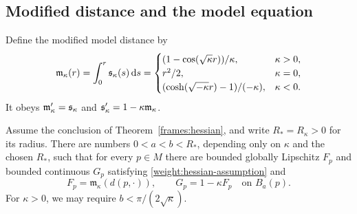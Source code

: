\subsection{Modified distance and the model equation}

Define the modified model distance by
\[
\mathfrak m_\kappa(r)=\int_0^r\mathfrak s_\kappa(s)\,\mathrm d s
=\begin{cases}
(1-\cos(\sqrt\kappa r))/\kappa,&\kappa>0,\\
r^2/2,&\kappa=0,\\
(\cosh(\sqrt{-\kappa}r)-1)/(-\kappa),&\kappa<0.
\end{cases}
\]
It obeys \(\mathfrak m_\kappa'=\mathfrak s_\kappa\) and
\(\mathfrak s'_\kappa=1-\kappa\mathfrak m_\kappa\).

\begin{lemma}
\label{weight:distance-modification}
Assume the conclusion of Theorem~\ref{frames:hessian}, and
write \(R_*=R_\kappa>0\) for its radius.
There are numbers \(0<a<b<R_*\),
depending only on \(\kappa\) and the chosen \(R_*\), such that for every \(p\in M\)
there are bounded globally Lipschitz \(F_p\) and bounded
continuous \(G_p\) satisfying \eqref{weight:hessian-assumption}
and
\begin{equation}
\label{weight:local-modification}
F_p=\mathfrak m_\kappa(d(p,\cdot)),\qquad
G_p=1-\kappa F_p\quad\text{on }B_a(p).
\end{equation}
For \(\kappa>0\), we may require
\(b<\pi/(2\sqrt\kappa)\).
\end{lemma}


